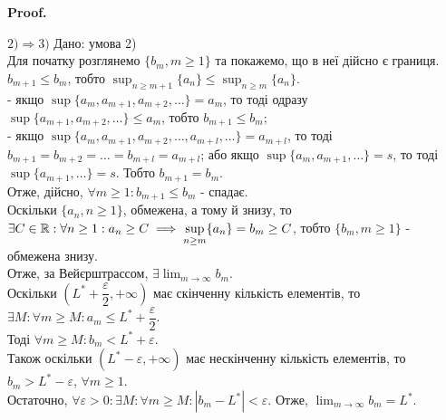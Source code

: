 \documentclass[a4paper, 14pt]{article}
\makeatletter
\def\qed{$\blacksquare$}
\theoremstyle{theoremdd}
\theoremstyle{theoremdd}
\theoremstyle{theoremdd}
\theoremstyle{theoremdd}
\theoremstyle{theoremdd}
\theoremstyle{theoremdd}
\theoremstyle{theoremdd}
\theoremstyle{theoremdd}
\renewenvironment{proof}[1][Proof.\\]{\par
\pushQED{\hfill \qed}%
\normalfont \topsep6\p@\@plus6\p@\relax
\trivlist
\item\relax
{\bfseries
#1\@addpunct{.}}\hspace\labelsep\ignorespaces
}{%
\popQED\endtrivlist\@endpefalse
}
\makeatother
\begin{document}
\begin{proof}
	$\boxed{2) \Rightarrow 3)}$ Дано: умова 2)\\
	Для початку розглянемо $\{b_m, m \geq 1\}$ та покажемо, що в неї дійсно є границя.\\
	$b_{m+1} \leq b_m$, тобто $\displaystyle \sup_{n \geq m+1} \{a_n\} \leq \sup_{n \geq m} \{a_n\}$.\\
	- якщо $\displaystyle \sup \{a_m, a_{m+1},a_{m+2},\dots\} = a_m$, то тоді одразу $\displaystyle \sup \{a_{m+1},a_{m+2},\dots\} \leq a_m$, тобто $b_{m+1} \leq b_m$;\\
	- якщо $\displaystyle \sup \{a_m, a_{m+1},a_{m+2},\dots, a_{m+l}, \dots\} = a_{m+l}$, то тоді $b_{m+1} = b_{m+2} = \dots = b_{m+l} = a_{m+l}$; або якщо $\sup \{a_m,a_{m+1},\dots\} = s$, то тоді $\sup \{a_{m+1},\dots\} = s$. Тобто $b_{m+1} = b_m$.\\
	Отже, дійсно, $\forall m \geq 1: b_{m+1} \leq b_m$ - спадає.\\
	Оскільки $\{a_n, n \geq 1\}$, обмежена, а тому й знизу, то $\exists C \in \mathbb{R}: \forall n \geq 1: a_n \geq C \\ \implies \displaystyle \sup_{n \geq m} \{a_n\} = b_m \geq C$, тобто $\{b_m, m \geq 1\}$ - обмежена знизу. \\
	Отже, за Вейєрштрассом, $\exists \displaystyle \lim_{m \to \infty} b_m$.\\
	Оскільки $\left( L^*+\dfrac{\varepsilon}{2}, + \infty \right)$ має скінченну кількість елементів, то $\exists M: \forall m \geq M: a_m \leq L^* + \dfrac{\varepsilon}{2}$.\\
	Тоді $\forall m \geq M: b_m < L^* + \varepsilon$.\\
	Також оскільки $(L^*-\varepsilon, + \infty)$ має нескінченну кількість елементів, то $b_m > L^* - \varepsilon$, $\forall m \geq 1$.\\
	Остаточно, $\forall \varepsilon > 0: \exists M: \forall m \geq M: |b_m - L^*| < \varepsilon$. Отже, $\displaystyle \lim_{m \to \infty} b_m = L^*$.
	\bigskip \\
	

\end{proof}
\end{document}
